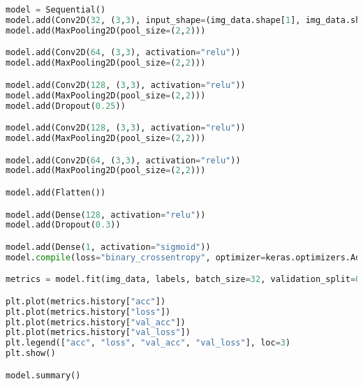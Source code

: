 \section{}
\label{sec:appa}
\begin{lstlisting}[language=Python, caption=CNN for galaxy classification with TensorFlow]
model = Sequential()
model.add(Conv2D(32, (3,3), input_shape=(img_data.shape[1], img_data.shape[2], img_data.shape[3]), activation="relu"))
model.add(MaxPooling2D(pool_size=(2,2)))

model.add(Conv2D(64, (3,3), activation="relu"))
model.add(MaxPooling2D(pool_size=(2,2)))

model.add(Conv2D(128, (3,3), activation="relu"))
model.add(MaxPooling2D(pool_size=(2,2)))
model.add(Dropout(0.25))

model.add(Conv2D(128, (3,3), activation="relu"))
model.add(MaxPooling2D(pool_size=(2,2)))

model.add(Conv2D(64, (3,3), activation="relu"))
model.add(MaxPooling2D(pool_size=(2,2)))

model.add(Flatten())

model.add(Dense(128, activation="relu"))
model.add(Dropout(0.3))

model.add(Dense(1, activation="sigmoid"))
model.compile(loss="binary_crossentropy", optimizer=keras.optimizers.Adam(lr=0.0001), metrics=["accuracy"])

metrics = model.fit(img_data, labels, batch_size=32, validation_split=0.3, epochs=30)

plt.plot(metrics.history["acc"])
plt.plot(metrics.history["loss"])
plt.plot(metrics.history["val_acc"])
plt.plot(metrics.history["val_loss"])
plt.legend(["acc", "loss", "val_acc", "val_loss"], loc=3)
plt.show()

model.summary()
\end{lstlisting}